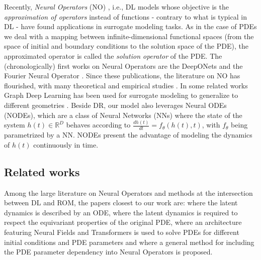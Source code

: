 Recently, \textit{Neural Operators} (NO) \cite{kovachki2021neural, bartolucci2023representation}, i.e., DL models whose objective is the \textit{approximation of operators} instead of functions - contrary to what is typical in DL - have found applications in surrogate modeling tasks. As in the case of PDEs we deal with a mapping between infinite-dimensional functional spaces (from the space of initial and boundary conditions to the solution space of the PDE), the approximated operator is called the \textit{solution operator} of the PDE. The (chronologically) first works on Neural Operators are the DeepONets \cite{Lu2021} and the Fourier Neural Operator \cite{li2020fourier}. Since these publications, the literature on NO has flourished, with many theoretical and empirical studies \cite{kovachki2021neural, CNO, Lu2022_afaircomparison, hao2023gnot, kissas2022learning,li2024geometry, gupta2022towards, jin2022mionet}. In some related works Graph Deep Learning has been used for surrogate modeling to generalize to different geometries \cite{brandstetter2022message,pichi2023graph, Franco2023, equer2023multi}. Beside DR, our model also leverages Neural ODEs \cite{chen2018neural} (NODEs), which are a class of Neural Networks (NNs) where the state of the system $h(t)\in\mathbb{R}^D$ behaves according to $\frac{dh(t)}{dt}=f_\theta(h(t),t)$, with $f_{\theta}$ being parametrized by a NN.
NODEs present the advantage of modeling the dynamics of $h(t)$ continuously in time.
\subsection{Related works}
Among the large literature on Neural Operators and methods at the intersection between DL and ROM, the papers closest to our work are: \cite{knigge2024space} where the latent dynamics is described by an ODE, \cite{yin2023continuous} where the latent dynamics is required to respect the equivariant properties of the original PDE, \cite{vcnef-hagnberger:2024} where an architecture featuring Neural Fields and Transformers is used to solve PDEs for different initial conditions and PDE parameters and \cite{takamoto2023learning} where a general method for including the PDE parameter dependency into Neural Operators is proposed.


